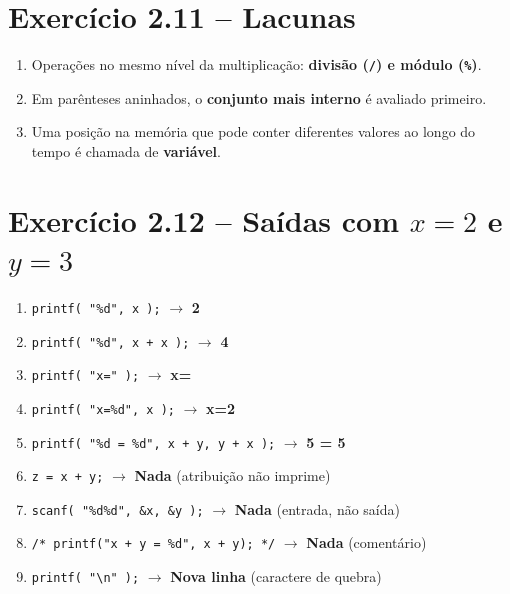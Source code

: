 \documentclass[12pt,a4paper]{article}
\begin{document}
\section{Exercício 2.11 -- Lacunas}

\begin{respostabox}
\begin{enumerate}[label=\textbf{\alph*)}]
\item Operações no mesmo nível da multiplicação: \textbf{divisão (\texttt{/}) e módulo (\texttt{\%})}.
\item Em parênteses aninhados, o \textbf{conjunto mais interno} é avaliado primeiro.
\item Uma posição na memória que pode conter diferentes valores ao longo do tempo é chamada de \textbf{variável}.
\end{enumerate}
\end{respostabox}

\newpage

\section{Exercício 2.12 -- Saídas com $x=2$ e $y=3$}

\begin{respostabox}
\begin{enumerate}[label=\textbf{\alph*)}]

\item \texttt{printf( "\%d", x );} $\to$ \textbf{2}
\item \texttt{printf( "\%d", x + x );} $\to$ \textbf{4}
\item \texttt{printf( "x=" );} $\to$ \textbf{x=}
\item \texttt{printf( "x=\%d", x );} $\to$ \textbf{x=2}
\item \texttt{printf( "\%d = \%d", x + y, y + x );} $\to$ \textbf{5 = 5}
\item \texttt{z = x + y;} $\to$ \textbf{Nada} (atribuição não imprime)
\item \texttt{scanf( "\%d\%d", \&x, \&y );} $\to$ \textbf{Nada} (entrada, não saída)
\item \texttt{/* printf("x + y = \%d", x + y); */} $\to$ \textbf{Nada} (comentário)
\item \texttt{printf( "\textbackslash n" );} $\to$ \textbf{Nova linha} (caractere de quebra)

\end{enumerate}
\end{respostabox}
\end{document}
